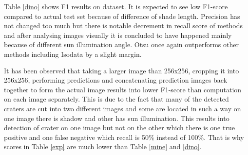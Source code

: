 \documentclass[11pt]{article}
\begin{document}
Table \ref{dino} shows F1 results on \cite{dino2020} dataset. It is expected to see low F1-score compared to actual test set because of difference of shade length. Precision has not changed too much but there is notable decrement in recall score of methods and after analysing images visually it is concluded to have happened mainly because of different sun illumination angle. Otsu once again outperforms other methods including Isodata by a slight margin.

It has been observed that taking a larger image than 256x256, cropping it into 256x256, performing predictions and concatenating prediction images back together to form the actual image results into lower F1-score than computation on each image separately. This is due to the fact that many of the detected craters are cut into two different images and some are located in such a way on one image there is shadow and other has sun illumination. This results into detection of crater on one image but not on the other which there is one true positive and one false negative which recall is 50\% instead of 100\%. That is why scores in Table \ref{exp} are much lower than Table \ref{mine} and \ref{dino}.
 
\end{document}
